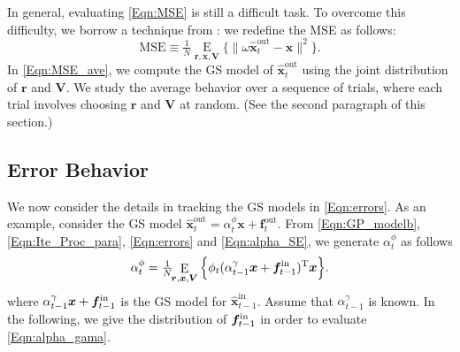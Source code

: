 \documentclass[journal]{IEEEtran}
\newcommand{\mr}{\mathrm}
\newcommand{\BE}{\begin{equation}}
\newcommand{\EE}{\end{equation}}
\renewcommand{\bf}{\bm}
\begin{document}
In general, evaluating \eqref{Eqn:MSE} is still a difficult task.  To overcome this difficulty, we borrow a technique from \cite{Donoho2009}: we redefine the MSE as follows:
\BE\label{Eqn:MSE_ave}
        \mr{MSE} \equiv \tfrac{1}{N}\!\!\mathop\mr{E}\limits_{\bf{r},\bf{x},\bf{V} }\big\{\|\omega \hat{\bf{x}}_{t}^{\mr{out}} - \bf{x}\|^2\big\}.
    \EE
In \eqref{Eqn:MSE_ave}, we compute the GS model of $\hat{\bf{x}}_{t}^{\mr{out}}$ using the joint distribution of $\bf{r}$ and $\bf{V}$. We study the average behavior over a sequence of trials, where each trial involves choosing $\bf{r}$ and $\bf{V}$ at random. (See the second paragraph of this section.)

\subsection{Error Behavior}\label{Sec:IID_error}
We now consider the details in tracking the GS models in \eqref{Eqn:errors}. As an example, consider the GS model $\hat{\bf{x}}_{t}^{\mr{out}} = \alpha_{t}^\phi\bf{x}+\bf{f}_{t}^{\mr{out}}$. From  \eqref{Eqn:GP_modelb}, \eqref{Eqn:Ite_Proc_para}, \eqref{Eqn:errors} and \eqref{Eqn:alpha_SE}, we generate $\alpha_{t}^\phi$ as follows
\BE\label{Eqn:alpha_gama}
\alpha^\phi_{t} =\tfrac{1}{N}\!\!\mathop\mr{E}\limits_{\bf{r},\bf{x},\bf{V} }\Big\{\phi_{t}(\alpha^\gamma_{t-1} \bf{x} + \bf{f}_{t-1}^{\rm in})^{\rm T} \bf{x} \Big\}.
\EE
where $\alpha^\gamma_{t-1} \bf{x} + \bf{f}_{t-1}^{\rm in}$ is the GS model for $\hat{\bf{x}}_{t-1}^{\mr{in}}$. Assume that $\alpha^\gamma_{t-1} $ is known. In the following, we give the distribution of $\bf{f}_{t-1}^{\rm in}$ in order to evaluate \eqref{Eqn:alpha_gama}. 
  
  
\end{document}
